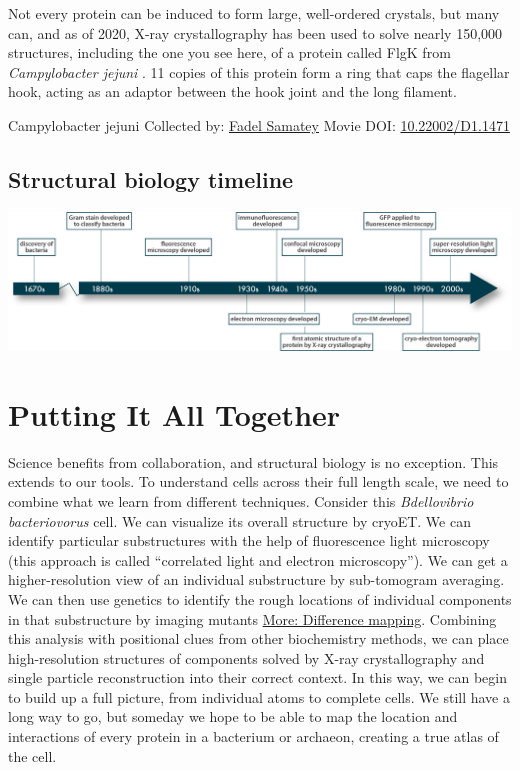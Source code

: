 \documentclass[]{tufte-book}
\begin{document}
Not every protein can be induced to form large, well-ordered crystals, but many can, and as of 2020, X-ray crystallography has been used to solve nearly 150,000 structures, including the one you see here, of a protein called FlgK from \emph{Campylobacter jejuni} \citep{bulieris2017}. 11 copies of this protein form a ring that caps the flagellar hook, acting as an adaptor between the hook joint and the long filament.



\hypertarget{htmlwidget-b84538c048c620cc3f0c}{}

\label{fig:1-9}Campylobacter jejuni Collected by: \protect\hyperlink{fadel_samatey}{Fadel Samatey} Movie DOI: \href{https://doi.org/10.22002/D1.1471}{10.22002/D1.1471}

\hypertarget{Structural_biology_timeline}{%
\subsection{Structural biology timeline}\label{Structural_biology_timeline}}

\includegraphics{img/schematics/1_9_1}

\hypertarget{putting-it-all-together}{%
\section{Putting It All Together}\label{putting-it-all-together}}

Science benefits from collaboration, and structural biology is no exception. This extends to our tools. To understand cells across their full length scale, we need to combine what we learn from different techniques. Consider this \emph{Bdellovibrio bacteriovorus} cell. We can visualize its overall structure by cryoET. We can identify particular substructures with the help of fluorescence light microscopy (this approach is called ``correlated light and electron microscopy''). We can get a higher-resolution view of an individual substructure by sub-tomogram averaging. We can then use genetics to identify the rough locations of individual components in that substructure by imaging mutants \protect\hyperlink{Difference_mapping}{More: Difference mapping}. Combining this analysis with positional clues from other biochemistry methods, we can place high-resolution structures of components solved by X-ray crystallography and single particle reconstruction into their correct context. In this way, we can begin to build up a full picture, from individual atoms to complete cells. We still have a long way to go, but someday we hope to be able to map the location and interactions of every protein in a bacterium or archaeon, creating a true atlas of the cell.
\end{document}
